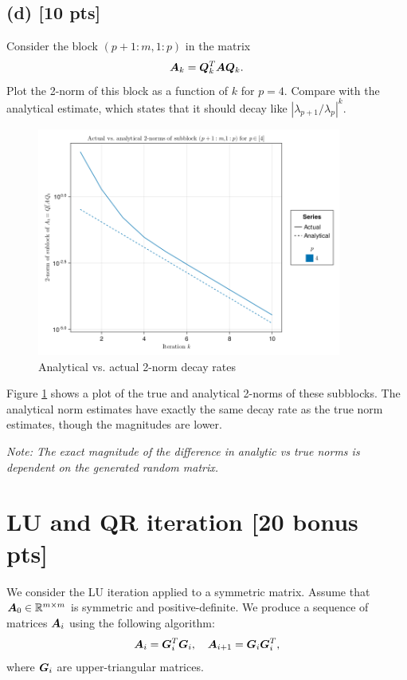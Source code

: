 \documentclass[twoside,10pt]{article}
\begin{document}
  \subsection*{(d) [10 pts]}
    Consider the block $(p + 1 : m, 1 : p)$ in the matrix 
    \begin{equation}
      \bm{A}_k = \bm{Q}^T_{k} \bm{A} \bm{Q}_{k}.
    \end{equation}
    Plot the 2-norm of this block as a function of $k$ for $p = 4$. Compare with the analytical estimate, which states that it should decay like $|\lambda_{p + 1} / \lambda_p|^k$.
    
    \begin{figure}[htb]
      \begin{center}
      \includegraphics[width=100mm]{HW5_code/norms_final.png}
      \end{center}
      \caption{Analytical vs. actual 2-norm decay rates}
      \label{fig:figure2}
    \end{figure}
    \quad Figure \ref{fig:figure2} shows a plot of the true and analytical 2-norms of these subblocks.
    The analytical norm estimates have exactly the same decay rate as the true norm estimates, though the magnitudes are lower.
  
    \textit{Note: The exact magnitude of the difference in analytic vs true norms is dependent on the generated random matrix.}

\section{LU and QR iteration [20 bonus pts]}
We consider the LU iteration applied to a symmetric matrix. Assume that $\bm{A}_0 \in \mathbb{R}^{m \times m}$ is symmetric and positive-definite. 
We produce a sequence of matrices $\bm{A}_i$ using the following algorithm:
\begin{equation}
  \bm{A}_i = \bm{G}^T_i \bm{G}_i, \quad \bm{A}_{i + 1} = \bm{G}_i \bm{G}_i^T, 
\end{equation}
where $\bm{G}_i$ are upper-triangular matrices.
\end{document}
